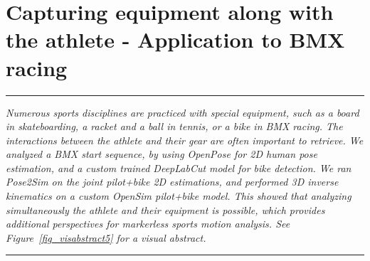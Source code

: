 
\lhead[\fancyplain{}{\leftmark}]%
      {\fancyplain{}{}} %
\chead[\fancyplain{}{}]%
      {\fancyplain{}{}}
\rhead[\fancyplain{}{}]%
      {\fancyplain{}{\rightmark}}%
\lfoot[\fancyplain{}{}]%
      {\fancyplain{}{}}
\cfoot[\fancyplain{}{\thepage}]%
      {\fancyplain{}{\thepage}} %
\rfoot[\fancyplain{}{}]%
     {\fancyplain{}{\scriptsize}}



\chapter{Capturing equipment along with the athlete - Application to BMX racing}
\label{ch:7}


\begin{center}
\rule{0.7\linewidth}{.5pt}
\begin{minipage}{0.7\linewidth}
\smallskip

\textit{Numerous sports disciplines are practiced with special equipment, such as a board in skateboarding, a racket and a ball in tennis, or a bike in BMX racing. The interactions between the athlete and their gear are often important to retrieve. We analyzed a BMX start sequence, by using OpenPose for 2D human pose estimation, and a custom trained DeepLabCut model for bike detection. We ran Pose2Sim on the joint {pilot+bike} 2D estimations, and performed 3D inverse kinematics on a custom OpenSim {pilot+bike} model. This showed that analyzing simultaneously the athlete and their equipment is possible, which provides additional perspectives for markerless sports motion analysis.\newline
See Figure~\ref{fig_visabstract5} for a visual abstract.
}

\end{minipage}
\smallskip
\rule{0.7\linewidth}{.5pt}
\end{center}

